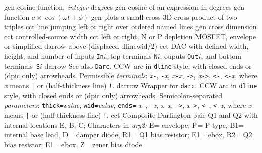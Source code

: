   {gen}
  {cosine function, {\sl integer\/} degrees}
  {gen}
  {cosine of an expression in degrees}
  {gen}
  {function $a\times\cos(\omega t + \phi)$ }
  {gen}
  {plots a small cross}
  {3D}
  {cross product of two triples}
  {cct}
  {line jumping left or right over ordered named lines}
  {gen}
  {cross dimension}
  {cct}
  {controlled-source width}
%
  {cct}
  {left or right, N or P depletion MOSFET, envelope or simplified
    }
  {darrow}
  {above (displaced dlinewid/2)}
  {cct}
  {DAC with defined width, height, and number of inputs {\tt In$i$},
    top terminals {\tt N$i$}, ouputs {\tt Out$i$},
    and bottom terminals~{\tt S$i$} }
  {darrow}
  {See also {\tt Darc}.
   CCW arc in {\tt dline} style, with closed ends or (dpic only) arrowheads.
  Permissible {\sl terminals}:
  {\sl x}{\tt -},
  {\tt -}{\sl x}, {\sl x}{\tt -}{\sl x}, {\tt ->}, {\sl x}{\tt ->},
  {\tt <-}, {\tt <-}{\sl x}, {\tt <->}
  where {\sl x} means {\tt |} or (half-thickness line) {\tt !}.}
  {darrow}
  {Wrapper for {\tt darc}.
   CCW arc in {\tt dline} style, with closed ends or (dpic only) arrowheads.
  Semicolon-separated {\sl parameters}:
  {\tt thick=}{\sl value}, {\tt wid=}{\sl value}, {\tt ends=}
  {\sl x}{\tt -},
  {\tt -}{\sl x}, {\sl x}{\tt -}{\sl x}, {\tt ->}, {\sl x}{\tt ->},
  {\tt <-}, {\tt <-}{\sl x}, {\tt <->}
  where {\sl x} means {\tt |} or (half-thickness line) {\tt !}.}
  {cct}
  {Composite Darlington pair Q1 and Q2 with internal locations E, B, C;
   Characters in {\sl arg2:}
   E= envelope,
   P= P-type,
   B1= internal base lead,
   D= damper diode,
   R1= Q1 bias resistor; E1= ebox,
   R2= Q2 bias resistor; E1= ebox,
   Z= zener bias diode 
    }
